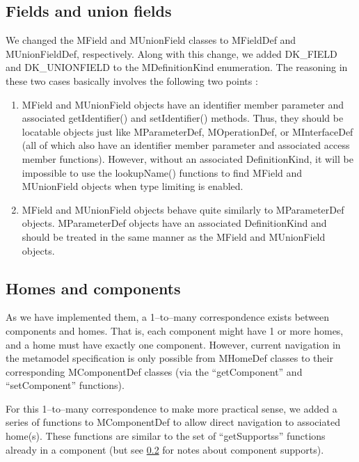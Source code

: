 \subsection{Fields and union fields}

We changed the MField and MUnionField classes to MFieldDef and MUnionFieldDef,
respectively. Along with this change, we added DK\_FIELD and DK\_UNIONFIELD to
the MDefinitionKind enumeration. The reasoning in these two cases basically
involves the following two points :

\begin{enumerate}
\item MField and MUnionField objects have an identifier member parameter and
      associated getIdentifier() and setIdentifier() methods. Thus, they should
      be locatable objects just like MParameterDef, MOperationDef, or
      MInterfaceDef (all of which also have an identifier member parameter and
      associated access member functions). However, without an associated
      DefinitionKind, it will be impossible to use the lookupName() functions to
      find MField and MUnionField objects when type limiting is enabled.
\item MField and MUnionField objects behave quite similarly to MParameterDef
      objects. MParameterDef objects have an associated DefinitionKind and
      should be treated in the same manner as the MField and MUnionField
      objects.
\end{enumerate}

\subsection{Homes and components}

As we have implemented them, a 1--to--many correspondence exists between
components and homes. That is, each component might have 1 or more homes, and a
home must have exactly one component. However, current navigation in the
metamodel specification is only possible from MHomeDef classes to their
corresponding MComponentDef classes (via the ``getComponent'' and
``setComponent'' functions).

For this 1--to--many correspondence to make more practical sense, we added a
series of functions to MComponentDef to allow direct navigation to associated
home(s). These functions are similar to the set of ``getSupportss'' functions
already in a component (but see \ref{} for notes about component supports).

